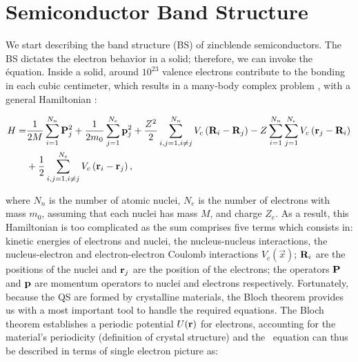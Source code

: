 \section{Semiconductor Band Structure}
\label{sec:chapter-1-semiconductor}
\vspace{-10mm}
We start describing the band structure (\gls{BS}) of zincblende semiconductors. The \gls{BS} dictates the electron behavior in a solid; therefore, we can invoke the \sch\' equation. Inside a solid, around $10^{23}$ valence electrons contribute to the bonding in each cubic centimeter, which results in a many-body complex problem \cite{piprek2017handbook}, with a general Hamiltonian \cite{alloul2010introduction,cardona2005fundamentals}: 

\begin{equation}
\begin{split}
	H  =  &\dfrac{1}{2M}\sum\limits_{i=1}^{N_{n}} \mathrm{\bf P}_{j}^{2} + \dfrac{1}{2m_{0}} \sum\limits_{j=1}^{N_{e}} \mathrm{\bf p}_{j}^{2} + \dfrac{Z^{2}}{2} \sum\limits_{i,j=1,i\neq j}^{N_{n}} V_{c}\left(\mathrm{\bf R}_{i}-\mathrm{\bf R}_{j}\right)-Z\sum\limits_{i=1}^{N_{n}}\sum\limits_{j=1}^{N_{e}}V_{c}\left(\mathrm{\bf r}_{j}-\mathrm{\bf R}_{i}\right) \\
	   & + \dfrac{1}{2} \sum\limits_{i,j=1,i\neq j}^{N_{e}} V_{c} \left(\mathrm{\bf r}_{i}-\mathrm{\bf r}_{j}\right),
\end{split}
\label{eq:chapter-1-solid-hamiltonian}
\end{equation}

where  $N_{n}$ is the number of atomic nuclei, $N_{e}$ is the number of electrons with mass $m_{0}$, assuming that each nuclei has mass $M$, and charge $Z_{e}$. As a result, this Hamiltonian is too complicated as the sum comprises five terms which consists in: kinetic energies of electrons and nuclei, the nucleus-nucleus interactions, the nucleus-electron and electron-electron Coulomb interactions $V_{c}\left(\vec{x}\right)$; $\mathrm{\bf R}_{i}$ are the positions of the nuclei and $\mathrm{\bf r}_{j}$ are the position of the electrons; the operators $\mathrm{\bf P}$ and $\mathrm{\bf p}$ are momentum operators to nuclei and electrons respectively\cite{alloul2010introduction}.
Fortunately, because  the \gls{QS} are formed by crystalline materials, the Bloch theorem provides us with a most important tool to handle the required equations. The Bloch theorem establishes a periodic potential $U(\displaystyle\mathrm{\bf r})$ for electrons, accounting for the material's periodicity (definition of crystal structure) and the \sch\, equation can thus be described in terms of single electron picture as:  


